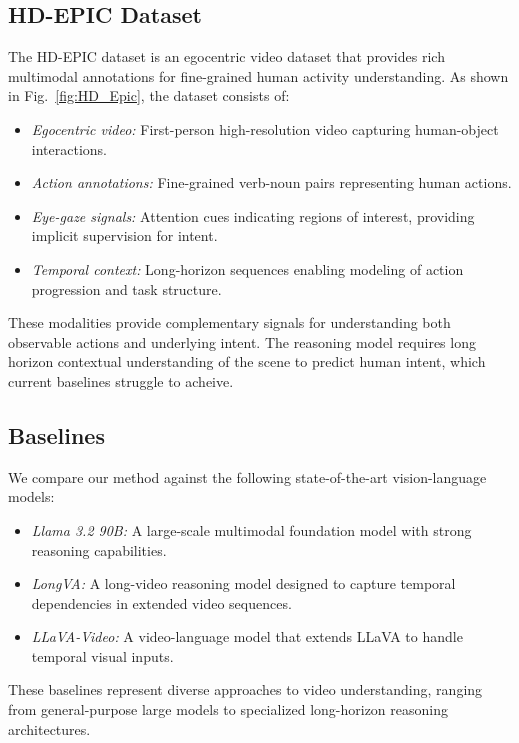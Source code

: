 \documentclass[letterpaper, 10 pt, conference]{ieeeconf}  %
\begin{document}
\subsection{HD-EPIC Dataset}

The HD-EPIC dataset is an  egocentric video dataset that provides rich multimodal annotations for fine-grained human activity understanding. As shown in Fig.~\ref{fig:HD_Epic}, the dataset consists of:

\begin{itemize}
    \item \textit{Egocentric video:} First-person high-resolution video capturing human-object interactions.
    \item \textit{Action annotations:} Fine-grained verb-noun pairs representing human actions.
    \item \textit{Eye-gaze signals:} Attention cues indicating regions of interest, providing implicit supervision for intent.
    \item \textit{Temporal context:} Long-horizon sequences enabling modeling of action progression and task structure.
\end{itemize}

These modalities provide complementary signals for understanding both observable actions and underlying intent. The reasoning model requires long horizon contextual understanding of the scene to predict human intent, which current baselines struggle to acheive.  



\subsection{Baselines}

We compare our method against the following state-of-the-art vision-language models:

\begin{itemize}
    \item \textit{Llama 3.2 90B:} A large-scale multimodal foundation model with strong reasoning capabilities.
    \item \textit{LongVA:} A long-video reasoning model designed to capture temporal dependencies in extended video sequences.
    \item \textit{LLaVA-Video:} A video-language model that extends LLaVA to handle temporal visual inputs.
\end{itemize}

These baselines represent diverse approaches to video understanding, ranging from general-purpose large models to specialized long-horizon reasoning architectures.
\end{document}
